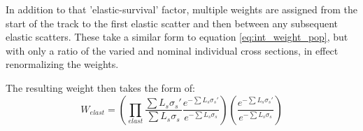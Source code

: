\documentclass[12pt]{article}
\begin{document}
In addition to that 'elastic-survival' factor, multiple weights are assigned from the start of the track to the first elastic scatter and then between any subsequent elastic scatters. These take a similar form to equation \ref{eq:int_weight_pop}, but with only a ratio of the varied and nominal individual cross sections, in effect renormalizing the weights. 

The resulting weight then takes the form of:
\begin{equation}
W_{elast} = (\prod \limits_{elast} \frac{\sum L_s \sigma_s'}{\sum L_s \sigma_s} \frac{e^{-\sum L_s  \sigma_{s}'}}{e^{-\sum L_s  \sigma_{s}}})(\frac{e^{-\sum L_s \sigma_{s}'}}{e^{-\sum L_s \sigma_{s}}})
\end{equation}
%
%
%





%

%


%
%
\end{document}
